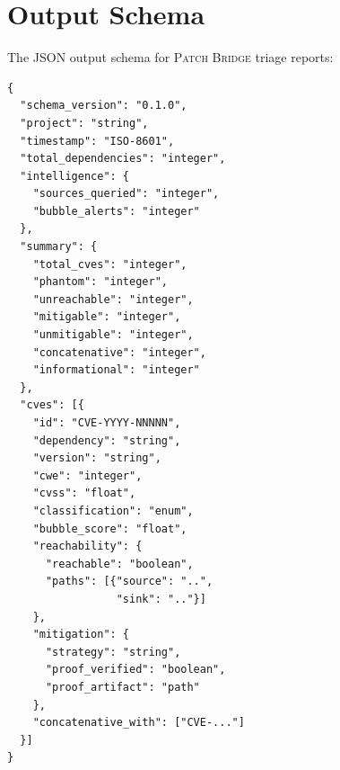 \documentclass[11pt,twocolumn]{article}
\begin{document}
\section{Output Schema}
\label{app:schema}

The JSON output schema for \textsc{Patch Bridge} triage reports:

\begin{lstlisting}[language={},caption={Triage report JSON schema (abbreviated)},label=lst:app-schema]
{
  "schema_version": "0.1.0",
  "project": "string",
  "timestamp": "ISO-8601",
  "total_dependencies": "integer",
  "intelligence": {
    "sources_queried": "integer",
    "bubble_alerts": "integer"
  },
  "summary": {
    "total_cves": "integer",
    "phantom": "integer",
    "unreachable": "integer",
    "mitigable": "integer",
    "unmitigable": "integer",
    "concatenative": "integer",
    "informational": "integer"
  },
  "cves": [{
    "id": "CVE-YYYY-NNNNN",
    "dependency": "string",
    "version": "string",
    "cwe": "integer",
    "cvss": "float",
    "classification": "enum",
    "bubble_score": "float",
    "reachability": {
      "reachable": "boolean",
      "paths": [{"source": "..",
                 "sink": ".."}]
    },
    "mitigation": {
      "strategy": "string",
      "proof_verified": "boolean",
      "proof_artifact": "path"
    },
    "concatenative_with": ["CVE-..."]
  }]
}
\end{lstlisting}
\end{document}
